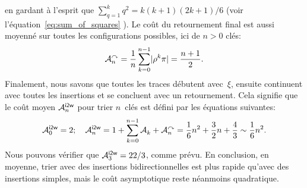 en gardant à l'esprit que \(\sum_{q=1}^{k}{q^2} = k(k+1)(2k+1)/6\)
(voir l'équation~\eqref{eq:sum_of_squares}
). Le coût du retournement final est aussi
moyenné sur toutes les configurations possibles, ici de \(n>0\) clés:
\begin{equation*}
\M{\curvearrowright}{n} = \frac{1}{n}\sum_{k=0}^{n-1}\len{\rho^k\pi}
                        = \frac{n+1}{2}.
\end{equation*}
Finalement, nous savons que toutes les traces débutent avec~\(\xi\),
ensuite continuent avec toutes les insertions et se concluent avec un
retournement. Cela signifie que le coût moyen
\(\M{\fun{i2w}}{n}\) pour trier
\(n\)~clés est défini par les équations suivantes:
\begin{equation*}
\M{\fun{i2w}}{0} = 2;\quad
\M{\fun{i2w}}{n} = 1 + \sum_{k=0}^{n-1}{\M{}{k}} + \M{\curvearrowright}{n}
                 = \frac{1}{6}n^2 + \frac{3}{2}n + \frac{4}{3}
                 \sim \frac{1}{6}n^2.
\end{equation*}
Nous pouvons vérifier que \(\M{\fun{i2w}}{3} = 22/3\), comme prévu. En
conclusion, en moyenne, trier avec des insertions bidirectionnelles
est plus rapide qu'avec des insertions simples, mais le coût
asymptotique reste néanmoins quadratique.

